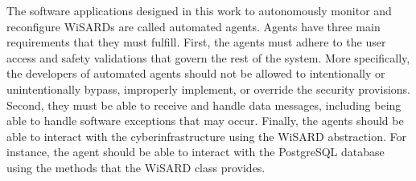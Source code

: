 The software applications designed in this work to autonomously monitor and reconfigure WiSARDs are called automated agents. Agents have three main requirements that they must fulfill. First, the agents must adhere to the user access and safety validations that govern the rest of the system. More specifically, the developers of automated agents should not be allowed to intentionally or unintentionally bypass, improperly implement, or override the security provisions. Second, they must be able to receive and handle data messages, including being able to handle software exceptions that may occur. Finally, the agents should be able to interact with the cyberinfrastructure using the WiSARD abstraction. For instance, the agent should be able to interact with the PostgreSQL database using the methods that the WiSARD class provides. \\








